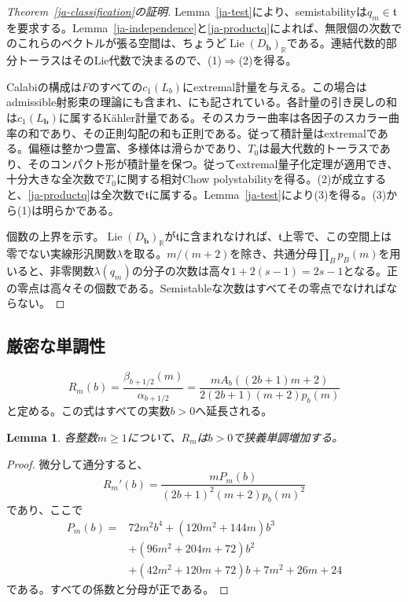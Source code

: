 \documentclass[12pt]{amsart}
\newtheorem{lem}[thm]{Lemma}
\theoremstyle{definition}
\theoremstyle{remark}
\numberwithin{equation}{section}
\DeclareMathOperator{\Lie}{Lie}
\newcommand{\R}{\mathbb{R}}
\begin{document}
\begin{proof}[Theorem~\ref{ja-classification}の証明]
Lemma~\ref{ja-test}により、semistabilityは$q_m\in\mathfrak t$を要求する。Lemma~\ref{ja-independence}と\eqref{ja-productq}によれば、無限個の次数でのこれらのベクトルが張る空間は、ちょうど$\Lie(D_{\boldsymbol b})_\R$である。連結代数的部分トーラスはそのLie代数で決まるので、(1)$\Rightarrow$(2)を得る。

Calabiの構成は$F$のすべての$c_1(L_b)$にextremal計量を与える。この場合はadmissible射影束の理論\cite{ja-Cal82,ja-ACGTF}にも含まれ、\cite[\S5.1]{ja-Jub26}にも記されている。各計量の引き戻しの和は$c_1(L_{\boldsymbol b})$に属するKähler計量である。そのスカラー曲率は各因子のスカラー曲率の和であり、その正則勾配の和も正則である。従って積計量はextremalである。偏極は整かつ豊富、多様体は滑らかであり、$T_0$は最大代数的トーラスであり、そのコンパクト形が積計量を保つ。従ってextremal量子化定理\cite{ja-Mab16,ja-Sey,ja-ST}が適用でき、十分大きな全次数で$T_0$に関する相対Chow polystabilityを得る。(2)が成立すると、\eqref{ja-productq}は全次数で$\mathfrak t$に属する。Lemma~\ref{ja-test}により(3)を得る。(3)から(1)は明らかである。

個数の上界を示す。$\Lie(D_{\boldsymbol b})_\R$が$\mathfrak t$に含まれなければ、$\mathfrak t$上零で、この空間上は零でない実線形汎関数$\lambda$を取る。$m/(m+2)$を除き、共通分母$\prod_Bp_B(m)$を用いると、非零関数$\lambda(q_m)$の分子の次数は高々$1+2(s-1)=2s-1$となる。正の零点は高々その個数である。Semistableな次数はすべてその零点でなければならない。
\end{proof}

\subsection{厳密な単調性}
\begin{equation}\label{ja-ratio}
 R_m(b)=\frac{\beta_{b+1/2}(m)}{\alpha_{b+1/2}}
 =\frac{mA_b((2b+1)m+2)}
 {2(2b+1)(m+2)p_b(m)}
\end{equation}
と定める。この式はすべての実数$b>0$へ延長される。

\begin{lem}\label{ja-monotone}
各整数$m\geq1$について、$R_m$は$b>0$で狭義単調増加する。
\end{lem}
\begin{proof}
微分して通分すると、
\begin{equation}\label{ja-derivative}
 R_m'(b)=
 \frac{mP_m(b)}{(2b+1)^2(m+2)p_b(m)^2}
\end{equation}
であり、ここで
\begin{align*}
P_m(b)={}&72m^2b^4+(120m^2+144m)b^3\\
 &+(96m^2+204m+72)b^2\\
 &+(42m^2+120m+72)b+7m^2+26m+24
\end{align*}
である。すべての係数と分母が正である。
\end{proof}
\end{document}
